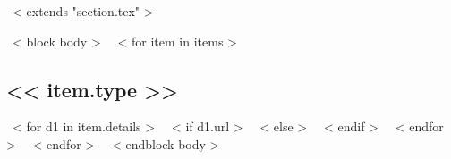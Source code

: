 ~< extends "section.tex" >~

~< block body >~
    ~< for item in items >~
	\subsection{<< item.type >>}
	~< for d1 in item.details >~
    ~< if d1.url >~
    ~< else >~
  ~< endif >~
	~< endfor >~
    ~< endfor >~
~< endblock body >~



